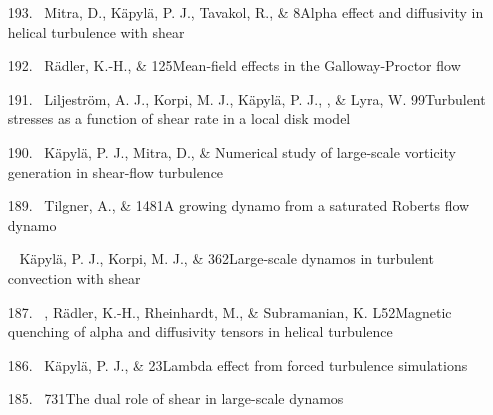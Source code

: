 \begin{itemize}
\item[{193.}~]
Mitra, D., K\"apyl\"a, P. J., Tavakol, R., \& \Brandenburg{}
{8}{Alpha effect and diffusivity in helical turbulence with shear}

\item[{192.}~]
R\"adler, K.-H., \& \Brandenburg{}
{125}{Mean-field effects in the Galloway-Proctor flow}

\item[{191.}~]
Liljestr\"om, A. J., Korpi, M. J., K\"apyl\"a, P. J., \Brandenburg, \&
Lyra, W.
{99}{Turbulent stresses as a function of shear rate in a local disk model}

\item[{190.}~]
K\"apyl\"a, P. J., Mitra, D., \& \Brandenburg{}
{Numerical study of large-scale vorticity generation in shear-flow turbulence}

\item[{189.}~]
Tilgner, A., \& \Brandenburg{}
{1481}{A growing dynamo from a saturated Roberts flow dynamo}

\item[\important \relevant {188.}~]
K\"apyl\"a, P. J., Korpi, M. J., \& \Brandenburg{}
{362}{Large-scale dynamos in turbulent convection with shear}

\item[{187.}~]
\Brandenburg, R\"adler, K.-H., Rheinhardt, M., \& Subramanian, K.
{L52}{Magnetic quenching of alpha and diffusivity tensors in helical turbulence}

\item[{186.}~]
K\"apyl\"a, P. J., \& \Brandenburg{}
{23}{Lambda effect from forced turbulence simulations}

\item[{185.}~]
\Brandenburg{}
{731}{The dual role of shear in large-scale dynamos}


\end{itemize}
